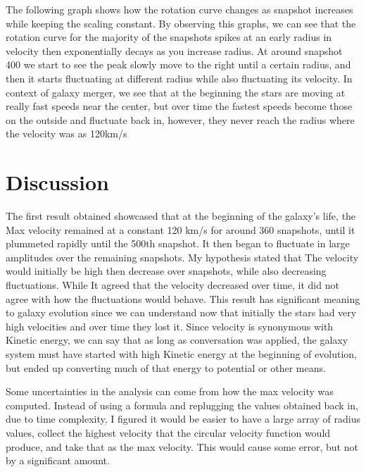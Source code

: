 \documentclass[modern]{aastex61}
\begin{document}
The following graph shows how the rotation curve changes as snapshot increases while keeping the scaling constant. By observing this graphs, we can see that the rotation curve for the majority of the snapshots spikes at an early radius in velocity then exponentially decays as you increase radius. At around snapshot 400 we start to see the peak slowly move to the right until a certain radius, and then it starts fluctuating at different radius while also fluctuating its velocity. In context of galaxy merger, we see that at the beginning the stars are moving at really fast speeds near the center, but over time the fastest speeds become those on the outside and fluctuate back in, however, they never reach the radius where the velocity was as 120km/s

\section{Discussion}
The first result obtained showcased that at the beginning of the galaxy's life, the Max velocity remained at a constant 120 km/s for around 360 snapshots, until it plummeted rapidly until the 500th snapshot. It then began to fluctuate in large amplitudes over the remaining snapshots. My hypothesis stated that The velocity would initially be high then decrease over snapshots, while also decreasing fluctuations. While It agreed that the velocity decreased over time, it did not agree with how the fluctuations would behave. This result has significant meaning to galaxy evolution since we can understand now that initially the stars had very high velocities and over time they lost it. Since velocity is synonymous with Kinetic energy, we can say that as long as conversation was applied, the galaxy system must have started with high Kinetic energy at the beginning of evolution, but ended up converting much of that energy to potential or other means.

Some uncertainties in the analysis can come from how the max velocity was computed. Instead of using a formula and replugging the values obtained back in, due to time complexity, I figured it would be easier to have a large array of radius values, collect the highest velocity that the circular velocity function would produce, and take that as the max velocity. This would cause some error, but not by a significant amount. 
\end{document}
